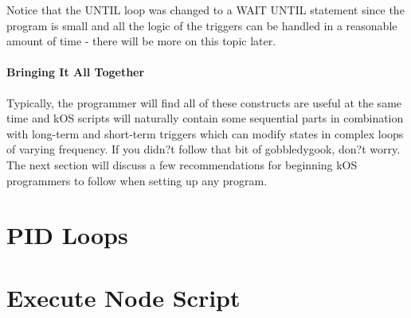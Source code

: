 Notice that the UNTIL loop was changed to a WAIT UNTIL statement since the program is small and all the logic of the triggers can be handled in a reasonable amount of time - there will be more on this topic later.

\paragraph{Bringing It All Together}
Typically, the programmer will find all of these constructs are useful at the same time and kOS scripts will naturally contain some sequential parts in combination with long-term and short-term triggers which can modify states in complex loops of varying frequency. If you didn?t follow that bit of gobbledygook, don?t worry. The next section will discuss a few recommendations for beginning kOS programmers to follow when setting up any program.


	\section{PID Loops}
	\section{Execute Node Script}
